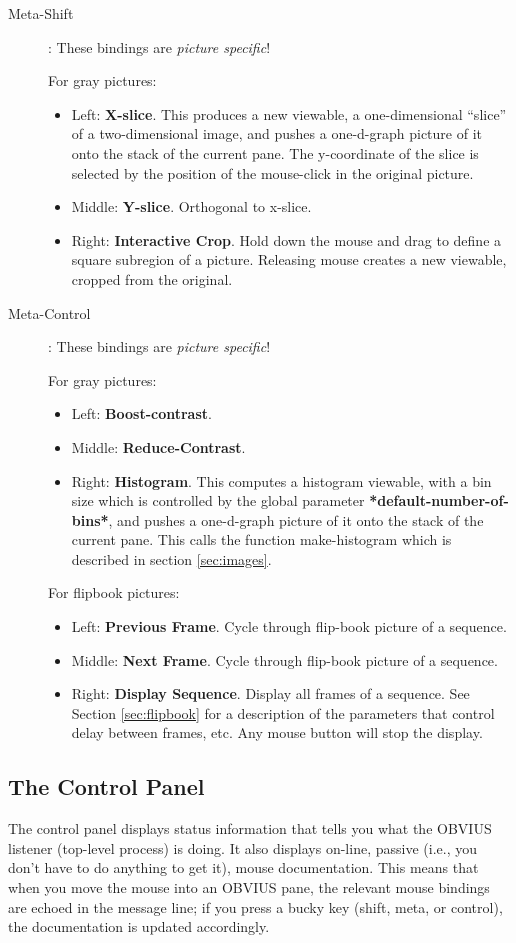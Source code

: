 \begin{description}
\item [Meta-Shift]:  These bindings are {\em picture specific}!

\noindent
For gray pictures:
\begin{itemize}
\item  Left: {\bf X-slice}. This produces a new viewable, a
one-dimensional ``slice'' of a two-dimensional image, and pushes a
one-d-graph picture of it onto the stack of the current pane.  The
y-coordinate of the slice is selected by the position of the
mouse-click in the original picture.
\item  Middle: {\bf Y-slice}. Orthogonal to x-slice.
\item Right: {\bf Interactive Crop}. Hold down the mouse and drag to
define a square subregion of a picture.  Releasing mouse creates a new
viewable, cropped from the original.
\end{itemize}

\item [Meta-Control]:  These bindings are {\em picture specific}!

\noindent
For gray pictures:
\begin{itemize}
\item Left: {\bf Boost-contrast}.
\item Middle: {\bf Reduce-Contrast}.
\item  Right: {\bf Histogram}.  This computes a histogram viewable, with
a bin size which is controlled by the global parameter {\bf
*default-number-of-bins*}, and pushes a one-d-graph picture of it onto
the stack of the current pane.  This calls the function make-histogram
which is described in section \ref{sec:images}.
\end{itemize}

\noindent
For flipbook pictures:
\begin{itemize}
\item Left: {\bf Previous Frame}.  Cycle through flip-book picture of a sequence.
\item Middle: {\bf Next Frame}. Cycle through flip-book picture of a sequence.
\item Right: {\bf Display Sequence}.  Display all frames of a
sequence.  See Section \ref{sec:flipbook} for a description of the
parameters that control delay between frames, etc.  Any mouse button
will stop the display.
\end{itemize}

\end{description}


\subsection{The Control Panel}
The control panel displays status information that tells you what the
OBVIUS listener (top-level process) is doing.  It also displays
on-line, passive (i.e., you don't have to do anything to get it),
mouse documentation.  This means that when you move the mouse into an
OBVIUS pane, the relevant mouse bindings are echoed in the message
line; if you press a bucky key (shift, meta, or control), the
documentation is updated accordingly.

